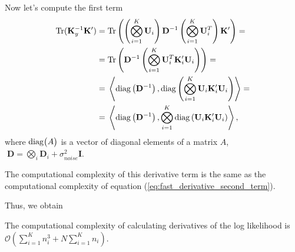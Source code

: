 Now let's compute the first term
\begin{equation}
  \begin{split}
    {\rm Tr}(\mathbf{K}_y^{-1} \mathbf{K}') = &\; {\rm Tr} \left (
      \left (\bigotimes_{i = 1}^K \mathbf{U}_i \right ) \mathbf{D}^{-1} \left (\bigotimes_{i = 1}^K \mathbf{U}_i^T \right ) \mathbf{K}'
    \right)= \\
    = &\; {\rm Tr} \left (\mathbf{D}^{-1} \left (\bigotimes_{i = 1}^K \mathbf{U}_i^T \mathbf{K}_i' \mathbf{U}_i \right ) \right ) = \\
    = &\; \left < {\rm diag} \left (\mathbf{D}^{-1} \right ), {\rm diag} \left (\bigotimes_{i = 1}^K \mathbf{U}_i \mathbf{K}_i' \mathbf{U}_i \right ) \right > = \\
    = &\; \left < {\rm diag} \left (\mathbf{D}^{-1} \right ),  \bigotimes_{i = 1}^K {\rm diag} \left ( \mathbf{U}_i \mathbf{K}_i' \mathbf{U}_i \right ) \right >,
  \end{split}
\end{equation}
where ${\rm diag}\big(A \big)$ is a vector of diagonal elements of a matrix $A$,
$\; \mathbf{D} = \bigotimes_i \mathbf{D}_i + \sigma_{noise}^2 \mathbf{I}$.


The computational complexity of this derivative term is the same as the computational
complexity of equation (\ref{eq:fast_derivative_second_term}).

Thus, we obtain
\begin{proposition}
  The computational complexity of calculating derivatives of the log likelihood is
  ${\mathcal{O}\left (\sum\limits_{i = 1}^K n_i^3 + N \sum\limits_{i = 1}^K n_i \right )}$.
\end{proposition}

